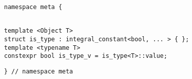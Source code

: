 
\begin{verbatim}
namespace meta {
\end{verbatim}
\begin{verbatim}

template <Object T>
struct is_type : integral_constant<bool, ... > { };
template <typename T>
constexpr bool is_type_v = is_type<T>::value;

\end{verbatim}
\begin{verbatim}
} // namespace meta
\end{verbatim}
